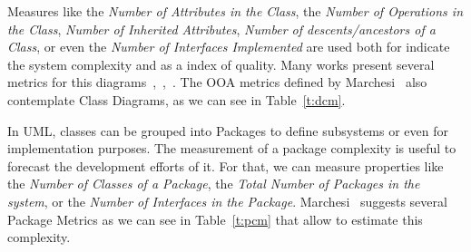 Measures like the \emph{Number of Attributes in the Class}, the \emph{Number of Operations in the Class}, \emph{Number of Inherited Attributes}, \emph{Number of descents/ancestors of a Class}, or even the \emph{Number of Interfaces Implemented} are used both for indicate the system complexity and as a index of quality.
Many works present several metrics for this diagrams~\cite{DBLP:journals/Lobjet/GeneroPC00},~\cite{Eichelberger_onclass},~\cite{Yi04acomparison}.
The OOA metrics defined by Marchesi~\cite{Marchesi:1998:OMU:522081.795010} also contemplate Class Diagrams, as we can see in Table~\ref{t:dcm}.


In UML, classes can be grouped into Packages to define subsystems or even for implementation purposes.
The measurement of a package complexity is useful to forecast the development efforts of it.
For that, we can measure properties like the \emph{Number of Classes of a Package}, the \emph{Total Number of Packages in the system}, or the \emph{Number of Interfaces in the Package}.
Marchesi~\cite{Marchesi:1998:OMU:522081.795010} suggests several Package Metrics as we can see in Table~\ref{t:pcm} that allow to estimate this complexity.


